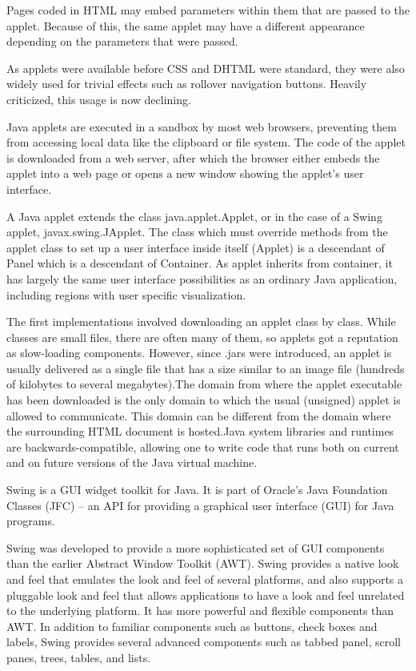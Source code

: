 Pages coded in HTML may embed parameters within them that are passed to the applet. Because of this, the same applet may have a different appearance depending on the parameters that were passed.

As applets were available before CSS and DHTML were standard, they were also widely used for trivial effects such as rollover navigation buttons. Heavily criticized, this usage is now declining.

Java applets are executed in a sandbox by most web browsers, preventing them from accessing local data like the clipboard or file system. The code of the applet is downloaded from a web server, after which the browser either embeds the applet into a web page or opens a new window showing the applet's user interface.

A Java applet extends the class java.applet.Applet, or in the case of a Swing applet, javax.swing.JApplet. The class which must override methods from the applet class to set up a user interface inside itself (Applet) is a descendant of Panel which is a descendant of Container. As applet inherits from container, it has largely the same user interface possibilities as an ordinary Java application, including regions with user specific visualization.

The first implementations involved downloading an applet class by class. While classes are small files, there are often many of them, so applets got a reputation as slow-loading components. However, since .jars were introduced, an applet is usually delivered as a single file that has a size similar to an image file (hundreds of kilobytes to several megabytes).The domain from where the applet executable has been downloaded is the only domain to which the usual (unsigned) applet is allowed to communicate. This domain can be different from the domain where the surrounding HTML document is hosted.Java system libraries and runtimes are backwards-compatible, allowing one to write code that runs both on current and on future versions of the Java virtual machine.

Swing is a GUI widget toolkit for Java. It is part of Oracle's Java Foundation Classes (JFC) – an API for providing a graphical user interface (GUI) for Java programs.

Swing was developed to provide a more sophisticated set of GUI components than the earlier Abstract Window Toolkit (AWT). Swing provides a native look and feel that emulates the look and feel of several platforms, and also supports a pluggable look and feel that allows applications to have a look and feel unrelated to the underlying platform. It has more powerful and flexible components than AWT. In addition to familiar components such as buttons, check boxes and labels, Swing provides several advanced components such as tabbed panel, scroll panes, trees, tables, and lists.

